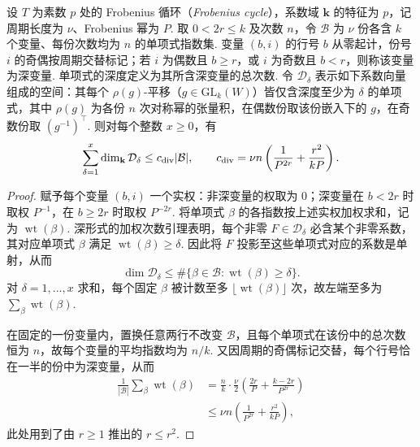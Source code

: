 \begin{lemma}[深形式滤过的总维数]
\label{lem:a-edge-deep-form-count}
\emitthmsource
设 $T$ 为素数 $p$ 处的 Frobenius 循环（\emph{Frobenius cycle}），系数域 $\mathbf k$ 的特征为 $p$，记周期长度为 $\nu$、Frobenius 幂为 $P$. 取 $0<2r\le k$ 及次数 $n$，令 $\mathcal B$ 为 $\nu$ 份各含 $k$ 个变量、每份次数均为 $n$ 的单项式指数集. 变量 $(b,i)$ 的行号 $b$ 从零起计，份号 $i$ 的奇偶按周期交替标记；若 $i$ 为偶数且 $b\ge r$，或 $i$ 为奇数且 $b<r$，则称该变量为深变量. 单项式的深度定义为其所含深变量的总次数. 令 $\mathcal D_\delta$ 表示如下系数向量组成的空间：其每个 $\rho(g)$-平移（$g\in\mathrm{GL}_k(W)$）皆仅含深度至少为 $\delta$ 的单项式，其中 $\rho(g)$ 为各份 $n$ 次对称幂的张量积，在偶数份取该份嵌入下的 $g$，在奇数份取 $(g^{-1})^\top$. 则对每个整数 $x\ge0$，有
\[
 \sum_{\delta=1}^x\dim_{\mathbf k}\mathcal D_\delta
 \le c_{\rm div}|\mathcal B|,
 \qquad
 c_{\rm div}=\nu n\left(\frac1{P^{2r}}+\frac{r^2}{kP}\right).
\]
\end{lemma}
\begin{proof}
赋予每个变量 $(b,i)$ 一个实权：非深变量的权取为 $0$；深变量在 $b<2r$ 时取权 $P^{-1}$，在 $b\ge2r$ 时取权 $P^{-2r}$. 将单项式 $\beta$ 的各指数按上述实权加权求和，记为 $\operatorname{wt}(\beta)$. 深形式的加权次数引理表明，每个非零 $F\in\mathcal D_\delta$ 必含某个非零系数，其对应单项式 $\beta$ 满足 $\operatorname{wt}(\beta)\ge\delta$. 因此将 $F$ 投影至这些单项式对应的系数是单射，从而
\[
 \dim\mathcal D_\delta
 \le \#\{\beta\in\mathcal B:\operatorname{wt}(\beta)\ge\delta\}.
\]
对 $\delta=1,\ldots,x$ 求和，每个固定 $\beta$ 被计数至多 $\lfloor\operatorname{wt}(\beta)\rfloor$ 次，故左端至多为 $\sum_\beta\operatorname{wt}(\beta)$.

在固定的一份变量内，置换任意两行不改变 $\mathcal B$，且每个单项式在该份中的总次数恒为 $n$，故每个变量的平均指数均为 $n/k$. 又因周期的奇偶标记交替，每个行号恰在一半的份中为深变量，从而
\[
 \begin{aligned}
 \frac1{|\mathcal B|}\sum_\beta\operatorname{wt}(\beta)
   &=\frac nk\cdot\frac{\nu}{2}
       \left(\frac{2r}{P}+\frac{k-2r}{P^{2r}}\right)\\
   &\le \nu n\left(\frac1{P^{2r}}+\frac{r^2}{kP}\right),
 \end{aligned}
\]
此处用到了由 $r\ge1$ 推出的 $r\le r^2$.
\end{proof}

